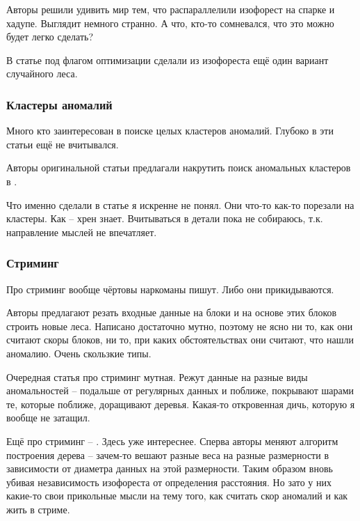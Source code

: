 \documentclass[12pt]{article}
\begin{document}
Авторы
\cite{taoParallelAlgorithmNetwork2018} 
решили удивить мир тем, что распараллелили изофорест на спарке и хадупе. Выглядит немного
странно. А что, кто-то сомневался, что это можно будет легко сделать?

В статье
\cite{liuOptimizedComputationalFramework2018}
под флагом оптимизации сделали из изофореста ещё один вариант случайного леса.

\subsubsection*{Кластеры аномалий}

Много кто заинтересован в поиске целых кластеров аномалий. Глубоко в эти статьи
ещё не вчитывался.

Авторы оригинальной статьи предлагали накрутить поиск аномальных кластеров в
\cite{liuDetectingClusteredAnomalies2010}
. 

Что именно сделали в статье
\cite{karczmarekKMeansbasedIsolationForest2020}
я искренне не понял. Они что-то как-то порезали на кластеры. Как -- хрен знает.
Вчитываться в детали пока не собираюсь, т.к. направление мыслей не впечатляет.


\subsubsection*{Стриминг}

Про стриминг вообще чёртовы наркоманы пишут. Либо они прикидываются.

Авторы
\cite{dingAnomalyDetectionApproach2013}
предлагают резать входные данные на блоки и на основе этих блоков строить новые 
леса. Написано достаточно мутно, поэтому не ясно ни то, как они считают скоры
блоков, ни то, при каких обстоятельствах они считают, что нашли аномалию. Очень
скользкие типы.

Очередная статья про стриминг
\cite{muClassificationStreamingEmerging2017}
мутная. Режут данные на разные виды аномальностей -- подальше от регулярных
данных и поближе, покрывают шарами те, которые поближе, доращивают деревья.
Какая-то откровенная дичь, которую я вообще не затащил.

Ещё про стриминг --
\cite{guhaRobustRandomCut2016}
. Здесь уже интереснее. Сперва авторы меняют алгоритм построения дерева --
зачем-то вешают разные веса на разные размерности в зависимости от диаметра
данных на этой размерности. Таким образом вновь убивая независимость изофореста
от определения расстояния. Но зато у них какие-то свои прикольные мысли на тему того,
как считать скор аномалий и как жить в стриме.
\end{document}
